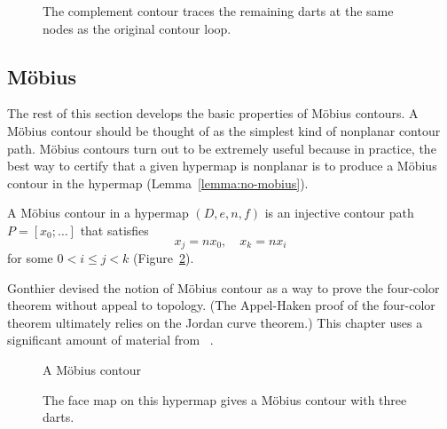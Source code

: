 \begin{figure}[htb]
\centering
{}
\caption{The complement contour traces the remaining darts
at the same nodes as the original contour loop. }
\label{fig:contour-comp}
\end{figure}


\subsection{M\"obius}

The rest of this section develops the basic properties of M\"obius
contours.  A M\"obius contour should be thought of as the simplest
kind of nonplanar contour path.  M\"obius contours turn out to be
extremely useful because in practice, the best way to certify that a
given hypermap is nonplanar is to produce a M\"obius contour in the
hypermap (Lemma~\ref{lemma:no-mobius}).

\begin{definition}
 A M\"obius contour in a hypermap
$(D,e,n,f)$ is an
injective contour path $P=[x_0;\ldots]$ that satisfies
\begin{equation}
\label{eqn:mobius}
x_j = n x_0,\quad x_k = n x_i
\end{equation}
for some $0 < i\le j< k$ (Figure~\ref{fig:mobius}).
%
\end{definition}


\begin{remark}
Gonthier devised the notion of M\"obius contour as a way to prove
the four-color theorem without appeal to topology.  (The Appel-Haken
proof of the four-color theorem ultimately relies on the Jordan curve theorem.)
This chapter uses a significant amount of material from ~\cite{Gonthier:2005:FourColor}.
\end{remark}

\begin{figure}[htb]
\centering
{}
\caption{A M\"obius contour}
\label{fig:mobius}
\end{figure}

\begin{figure}[htb]
\centering
{}
\caption{The face map on this hypermap gives a M\"obius contour with
three darts.}
\label{fig:3m}
\end{figure}

